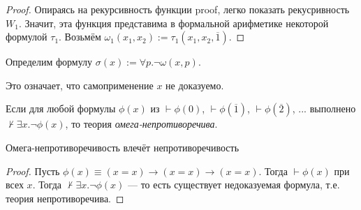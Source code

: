 \begin{proof}
    Опираясь на рекурсивность функции proof, легко показать рекусривность $W_1$.
Значит, эта функция представима в формальной арифметике некоторой формулой $\tau_1$.
Возьмём $\omega_1(x_1,x_2) := \tau_1(x_1,x_2,\overline{1})$.
\end{proof}

\begin{definition}
    Определим формулу $\sigma(x) := \forall p.\neg\omega(x,p)$.

    Это означает, что самоприменение $x$ не доказуемо.
\end{definition}


\begin{definition}
    Если для любой формулы $\phi(x)$ из $\vdash\phi(0)$, $\vdash\phi(\overline{1})$,
$\vdash\phi(\overline{2})$, ... выполнено $\not\vdash\exists x.\neg\phi(x)$,
то теория \emph{омега-непротиворечива}.
\end{definition}
\begin{theorem}
    Омега-непротиворечивость влечёт непротиворечивость
\end{theorem}
\begin{proof}
    Пусть $\phi(x) \equiv (x=x)\rightarrow(x=x)\rightarrow(x=x)$. Тогда $\vdash\phi(x)$ при всех $x$.
Тогда $\not\vdash\exists x.\neg\phi(x)$ --- то есть существует недоказуемая формула, т.е. теория непротиворечива.
\end{proof}

